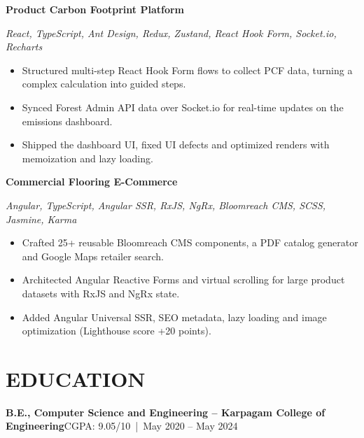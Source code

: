 \documentclass[10pt,a4paper]{article}
\newcommand{\entry}[2]{\textbf{#1}\hfill #2\par}
\newcommand{\stack}[1]{{\small\textit{#1}}\par}
\begin{document}
\entry{Product Carbon Footprint Platform}{}
\stack{React, TypeScript, Ant Design, Redux, Zustand, React Hook Form, Socket.io, Recharts}
\begin{itemize}
  \item Structured multi-step React Hook Form flows to collect PCF data, turning a complex calculation into guided steps.
  \item Synced Forest Admin API data over Socket.io for real-time updates on the emissions dashboard.
  \item Shipped the dashboard UI, fixed UI defects and optimized renders with memoization and lazy loading.
\end{itemize}
\vspace{1pt}
\entry{Commercial Flooring E-Commerce}{}
\stack{Angular, TypeScript, Angular SSR, RxJS, NgRx, Bloomreach CMS, SCSS, Jasmine, Karma}
\begin{itemize}
  \item Crafted 25+ reusable Bloomreach CMS components, a PDF catalog generator and Google Maps retailer search.
  \item Architected Angular Reactive Forms and virtual scrolling for large product datasets with RxJS and NgRx state.
  \item Added Angular Universal SSR, SEO metadata, lazy loading and image optimization (Lighthouse score +20 points).
\end{itemize}

\section*{EDUCATION}
\entry{B.E., Computer Science and Engineering -- Karpagam College of Engineering}{CGPA: 9.05/10 \,|\, May 2020 -- May 2024}

\end{document}
